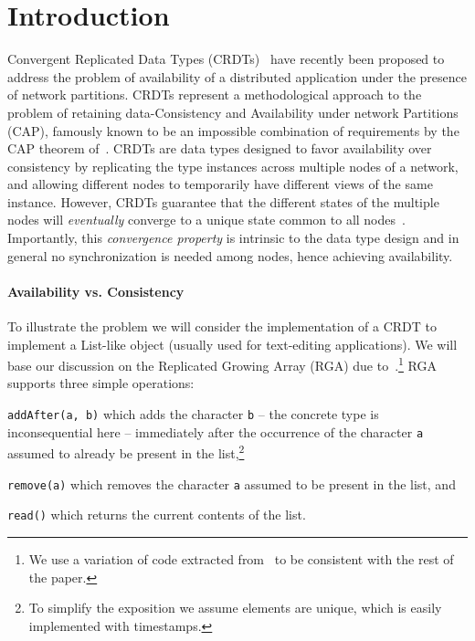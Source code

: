 \section{Introduction}
\label{sec:introduction}

Convergent Replicated Data Types (CRDTs)~\cite{ShapiroPBZ11} have
recently been proposed to address the problem of availability of a
distributed application under the presence of network partitions.
%
CRDTs represent a methodological approach to the problem of retaining
data-Consistency and Availability under network Partitions (CAP),
famously known to be an impossible combination of requirements by the
CAP theorem of~\citet{GilbertL02}.
%
CRDTs are data types designed to favor availability over consistency
by replicating the type instances across multiple nodes of a
network, and allowing different nodes to temporarily have different
views of the same instance.
%
However, CRDTs guarantee that the different states of the multiple
nodes will \emph{eventually} converge to a unique state common to all
nodes~\cite{Burckhardt14}.
%
Importantly, this \emph{convergence property} is intrinsic to the data
type design and in general no synchronization is needed among nodes,
hence achieving availability.

\paragraph{Availability vs. Consistency}
To illustrate the problem we will consider the implementation of a
CRDT to implement a List-like object (usually used for text-editing
applications).
%
We will base our discussion on the Replicated Growing Array (RGA) due
to~\cite{RohJKL11}.\footnote{We use a variation of code extracted
  from~\cite{ShapiroPBZ11} to be consistent with the rest of the
  paper.}
%
RGA supports three simple operations:
\begin{inparaenum}
\item \lstinline|addAfter(a, b)| which adds the character
  \lstinline|b| -- the concrete type is inconsequential here --
  immediately after the occurrence of the character \lstinline|a|
  assumed to already be present in the list,\footnote{To simplify the
    exposition we assume elements are unique, which is easily implemented
    with timestamps.}
\item \lstinline|remove(a)| which removes the character \lstinline|a|
  assumed to be present in the list, and
\item \lstinline|read()| which returns the current contents of the
  list.
\end{inparaenum}

